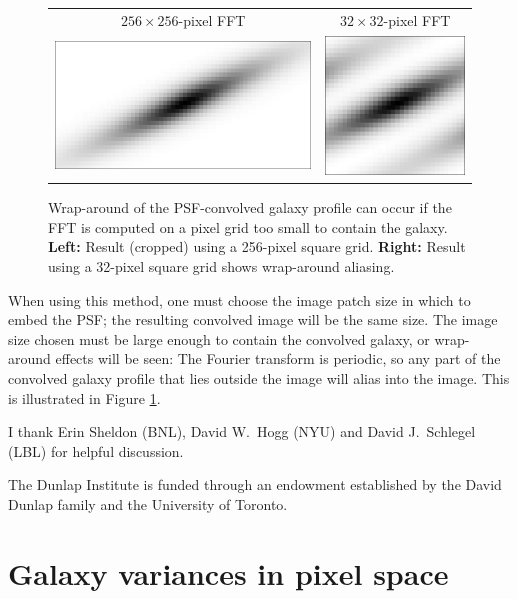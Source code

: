 \documentclass[11pt,preprint]{aastex}
\newcommand{\trick}{method}
\begin{document}
\begin{figure}
\begin{center}
\begin{tabular}{@{}cc@{}}
  $256 \times 256$-pixel FFT &
  $32 \times 32$-pixel FFT \\
  \includegraphics[height=0.22\textwidth]{gal-00} &
  \includegraphics[height=0.22\textwidth]{gal-01} \\
\end{tabular}
\end{center}
\caption{\label{fig:wrap}%
  Wrap-around of the PSF-convolved galaxy profile can occur if the FFT is
  computed on a pixel grid too small to contain the galaxy.
  \textbf{Left:} Result (cropped) using a 256-pixel square grid.
  \textbf{Right:} Result using a 32-pixel square grid shows wrap-around
  aliasing.
}
\end{figure}

When using this \trick, one must choose the image patch size in which
to embed the PSF; the resulting convolved image will be the same size.
The image size chosen must be large enough to contain the convolved
galaxy, or wrap-around effects will be seen: The Fourier transform is
periodic, so any part of the convolved galaxy profile that lies
outside the image will alias into the image.  This is
illustrated in Figure \ref{fig:wrap}.



\acknowledgements

I thank Erin Sheldon (BNL),
David W.~Hogg (NYU) and David J.~Schlegel (LBL)
for helpful discussion.

The Dunlap Institute is funded through an endowment established by the
David Dunlap family and the University of Toronto.




\appendix

\section{Galaxy variances in pixel space}
\label{app:transform}
\end{document}
